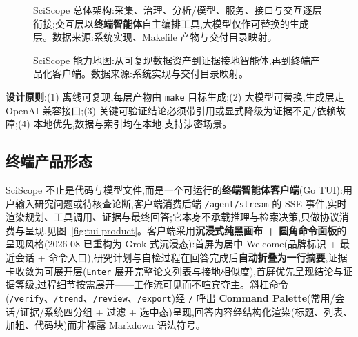 \begin{figure}[!htbp]
\caption{SciScope 总体架构:采集、治理、分析/模型、服务、接口与交互逐层衔接;交互层以\textbf{终端智能体}自主编排工具,大模型仅作可替换的生成层。数据来源:系统实现、Makefile 产物与交付目录映射。}
\label{fig:project-architecture}
\end{figure}

\begin{figure}[!htbp]
\centering
{}
\caption{SciScope 能力地图:从可复现数据资产到证据接地智能体,再到终端产品化客户端。数据来源:系统实现与交付目录映射。}
\label{fig:capability-map}
\end{figure}

\textbf{设计原则}:(1) 离线可复现,每层产物由 \texttt{make} 目标生成;(2) 大模型可替换,生成层走 OpenAI 兼容接口;(3) 关键可验证结论必须带引用或显式降级为证据不足/依赖故障;(4) 本地优先,数据与索引均在本地,支持涉密场景。

\subsection{终端产品形态}
SciScope 不止是代码与模型文件,而是一个可运行的\textbf{终端智能体客户端}(Go TUI):用户输入研究问题或待核查论断,客户端消费后端 \texttt{/agent/stream} 的 SSE 事件,实时渲染规划、工具调用、证据与最终回答;它本身不承载推理与检索决策,只做协议消费与呈现,见图~\ref{fig:tui-product}。客户端采用\textbf{沉浸式纯黑画布 + 圆角命令面板}的呈现风格(2026-08 已重构为 Grok 式沉浸态):首屏为居中 Welcome(品牌标识 + 最近会话 + 命令入口),研究计划与自检过程在回答完成后\textbf{自动折叠为一行摘要},证据卡收敛为可展开层(\texttt{Enter} 展开完整论文列表与接地相似度),首屏优先呈现结论与证据等级,过程细节按需展开——工作流可见而不喧宾夺主。斜杠命令(\texttt{/verify}、\texttt{/trend}、\texttt{/review}、\texttt{/export})经 \texttt{/} 呼出 \textbf{Command Palette}(常用/会话/证据/系统四分组 + 过滤 + 选中态)呈现,回答内容经结构化渲染(标题、列表、加粗、代码块)而非裸露 Markdown 语法符号。


